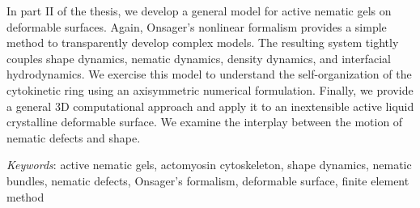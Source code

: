 \begin{Abstract}
	In  part II of the thesis, we develop a general model for active nematic gels on deformable surfaces. Again, Onsager's nonlinear formalism provides a simple method to transparently develop complex models. The resulting system tightly couples shape dynamics, nematic dynamics, density dynamics, and interfacial hydrodynamics. We exercise this model  to understand the self-organization of the cytokinetic ring using an  axisymmetric numerical formulation. Finally, we provide a general 3D computational approach and apply it to an inextensible active liquid crystalline deformable surface. We examine the interplay between the motion of nematic defects and shape.  
\end{Abstract}

{\footnotesize
	\emph{Keywords}: active nematic gels, actomyosin cytoskeleton, shape dynamics, nematic bundles, nematic defects, Onsager's formalism, deformable surface, finite element method
}
\vfill 
\cleardoublepage
